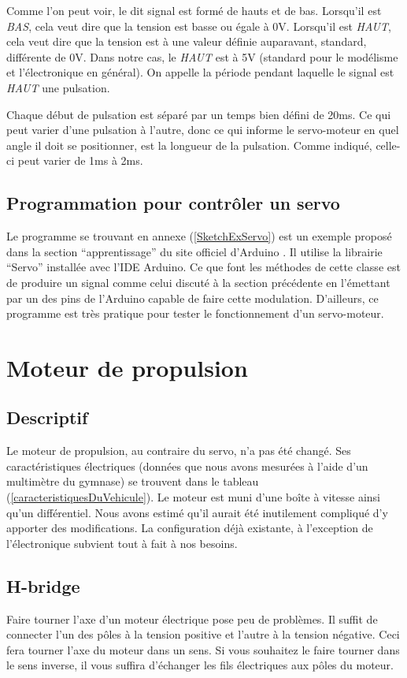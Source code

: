 \documentclass[a4paper,11pt]{report}
\begin{document}
{Comme l'on peut voir, le dit signal est form\'e de hauts et de
bas. Lorsqu'il est \emph{BAS}, cela veut dire que la tension est basse ou égale
à 0V. Lorsqu'il est
\emph{HAUT}, cela veut dire que la tension est à une valeur définie auparavant,
standard, différente de 0V. Dans notre cas, le \emph{HAUT} est à 5V (standard
pour le modélisme et l'électronique en général). On appelle la
période pendant laquelle le signal est \emph{HAUT} une pulsation.

Chaque début de pulsation est séparé par un temps bien défini de
20ms. Ce qui peut varier d'une pulsation \`a l'autre, donc ce qui informe le
servo-moteur en quel angle il doit se positionner, est la longueur de la
pulsation. Comme indiqué, celle-ci peut varier de 1ms \`a 2ms.

\subsection{Programmation pour contr\^oler un servo}
Le programme se trouvant en annexe (\ref{SketchExServo}) est un exemple propos\'e dans la section
``apprentissage'' du site officiel d'Arduino \cite{ServoSweep}. Il utilise la librairie
``Servo'' installée avec l'IDE Arduino. Ce que font les méthodes de cette
classe est de produire un signal comme celui discuté à la section
précédente en l'émettant par un des pins de l'Arduino capable de faire cette
modulation.
D'ailleurs, ce programme est tr\`es pratique pour tester le fonctionnement d'un servo-moteur. 

\section{Moteur de propulsion}

\subsection{Descriptif}

Le moteur de propulsion, au contraire du servo, n'a pas été changé.
 Ses caractéristiques électriques (données que nous avons mesurées à l'aide
d'un multimètre du gymnase) se trouvent dans le tableau
(\ref{caracteristiquesDuVehicule}). Le moteur est muni d'une boîte \`a vitesse ainsi qu'un
différentiel. Nous avons estimé qu'il aurait été
inutilement compliqué d'y apporter des modifications. La
configuration déjà existante, à l'exception de l'électronique
subvient tout à fait à nos besoins.  

\subsection{H-bridge}\label{h-bridge}
Faire tourner l'axe d'un moteur \'electrique pose peu de probl\`emes. Il
suffit de connecter l'un des p\^oles \`a la tension positive et l'autre \`a la tension
n\'egative. Ceci fera tourner l'axe du moteur dans un sens. Si vous souhaitez le
faire tourner dans le sens inverse, il vous suffira d'\'echanger les fils
\'electriques aux p\^oles du moteur.

}
\end{document}
